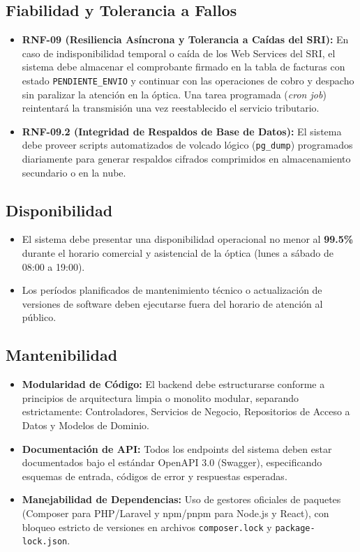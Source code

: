 \documentclass[12pt,a4paper]{report}
\begin{document}
\subsection{Fiabilidad y Tolerancia a Fallos}
\begin{itemize}
    \item \textbf{RNF-09 (Resiliencia Asíncrona y Tolerancia a Caídas del SRI):} En caso de indisponibilidad temporal o caída de los Web Services del SRI, el sistema debe almacenar el comprobante firmado en la tabla de facturas con estado \texttt{PENDIENTE\_ENVIO} y continuar con las operaciones de cobro y despacho sin paralizar la atención en la óptica. Una tarea programada (\textit{cron job}) reintentará la transmisión una vez reestablecido el servicio tributario.
    \item \textbf{RNF-09.2 (Integridad de Respaldos de Base de Datos):} El sistema debe proveer scripts automatizados de volcado lógico (\texttt{pg\_dump}) programados diariamente para generar respaldos cifrados comprimidos en almacenamiento secundario o en la nube.
\end{itemize}

\subsection{Disponibilidad}
\begin{itemize}
    \item El sistema debe presentar una disponibilidad operacional no menor al \textbf{99.5\%} durante el horario comercial y asistencial de la óptica (lunes a sábado de 08:00 a 19:00).
    \item Los períodos planificados de mantenimiento técnico o actualización de versiones de software deben ejecutarse fuera del horario de atención al público.
\end{itemize}

\subsection{Mantenibilidad}
\begin{itemize}
    \item \textbf{Modularidad de Código:} El backend debe estructurarse conforme a principios de arquitectura limpia o monolito modular, separando estrictamente: Controladores, Servicios de Negocio, Repositorios de Acceso a Datos y Modelos de Dominio.
    \item \textbf{Documentación de API:} Todos los endpoints del sistema deben estar documentados bajo el estándar OpenAPI 3.0 (Swagger), especificando esquemas de entrada, códigos de error y respuestas esperadas.
    \item \textbf{Manejabilidad de Dependencias:} Uso de gestores oficiales de paquetes (Composer para PHP/Laravel y npm/pnpm para Node.js y React), con bloqueo estricto de versiones en archivos \texttt{composer.lock} y \texttt{package-lock.json}.
\end{itemize}
\end{document}
